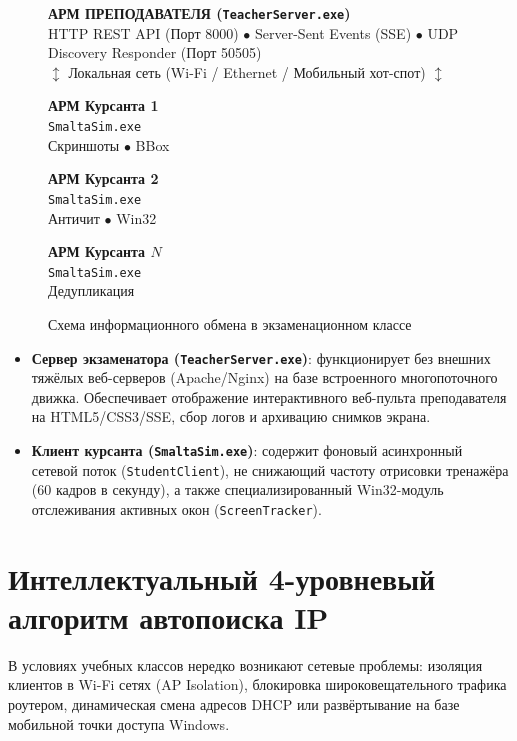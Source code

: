 \documentclass[12pt,a4paper]{report}
\begin{document}
\begin{figure}[H]
    \centering
    \begin{tcolorbox}[colback=white,colframe=primaryblue!60!black,arc=2mm,center,width=0.92\textwidth]
        \centering
        \textbf{АРМ ПРЕПОДАВАТЕЛЯ (\texttt{TeacherServer.exe})}\\[1mm]
        \small HTTP REST API (Порт 8000) $\bullet$ Server-Sent Events (SSE) $\bullet$ UDP Discovery Responder (Порт 50505)\\[2mm]
        $\updownarrow$ \footnotesize Локальная сеть (Wi-Fi / Ethernet / Мобильный хот-спот) $\updownarrow$\\[2mm]
        \parbox{0.28\textwidth}{\centering \textbf{АРМ Курсанта 1}\\ \scriptsize \texttt{SmaltaSim.exe}\\ Скриншоты $\bullet$ BBox}\hfill
        \parbox{0.28\textwidth}{\centering \textbf{АРМ Курсанта 2}\\ \scriptsize \texttt{SmaltaSim.exe}\\ Античит $\bullet$ Win32}\hfill
        \parbox{0.28\textwidth}{\centering \textbf{АРМ Курсанта $N$}\\ \scriptsize \texttt{SmaltaSim.exe}\\ Дедупликация}
    \end{tcolorbox}
    \caption{Схема информационного обмена в экзаменационном классе}
    \label{fig:net_arch}
\end{figure}

\begin{itemize}
    \item \textbf{Сервер экзаменатора (\texttt{TeacherServer.exe})}: функционирует без внешних тяжёлых веб-серверов (Apache/Nginx) на базе встроенного многопоточного движка. Обеспечивает отображение интерактивного веб-пульта преподавателя на HTML5/CSS3/SSE, сбор логов и архивацию снимков экрана.
    \item \textbf{Клиент курсанта (\texttt{SmaltaSim.exe})}: содержит фоновый асинхронный сетевой поток (\texttt{StudentClient}), не снижающий частоту отрисовки тренажёра (60 кадров в секунду), а также специализированный Win32-модуль отслеживания активных окон (\texttt{ScreenTracker}).
\end{itemize}

\section{Интеллектуальный 4-уровневый алгоритм автопоиска IP}
В условиях учебных классов нередко возникают сетевые проблемы: изоляция клиентов в Wi-Fi сетях (AP Isolation), блокировка широковещательного трафика роутером, динамическая смена адресов DHCP или развёртывание на базе мобильной точки доступа Windows.
\end{document}
